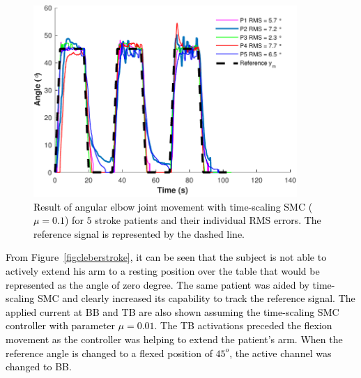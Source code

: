 \documentclass[review]{elsarticle}
\begin{document}
\begin{figure}[!htb]
\begin{center}
\includegraphics[width=10cm]{cabelograma01_2}
\caption{\textcolor{black}{Result of angular elbow joint movement with time-scaling SMC ($\mu=0.1$) for $5$ stroke patients and their individual RMS errors. The reference signal is represented by the dashed line.}}
\label{figallstroke_mu01}
\end{center}
\end{figure}




\textcolor{black}{From Figure~\ref{figcleberstroke}, it can be seen that the subject is not able to actively extend his arm to a resting position over the table that would be represented as the angle of zero degree. The same patient was aided by time-scaling SMC and clearly increased its capability to track the reference signal. The applied current at BB and TB are also shown assuming the time-scaling SMC controller with parameter $\mu=0.01$. The TB activations preceded the flexion movement as the controller was helping to extend the patient's arm. When the reference angle is changed to a flexed position of $45^{o}$, the active channel was changed to BB.}\\
%
\end{document}
